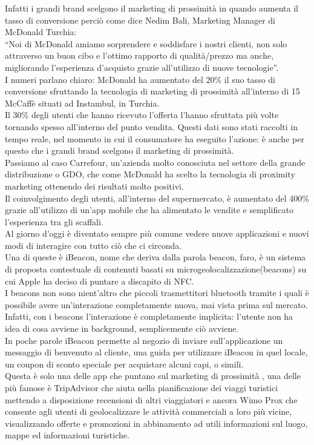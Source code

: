 Infatti i grandi brand scelgono il marketing di prossimità in quando aumenta il tasso di conversione perciò come dice Nedim Bali, Marketing Manager di McDonald Turchia:\\
“Noi di McDonald amiamo sorprendere e soddisfare i nostri clienti, non solo attraverso un buon cibo e l’ottimo rapporto di qualità/prezzo ma anche, migliorando l’esperienza d’acquisto grazie all’utilizzo di nuove tecnologie”.\cite{rif9}\\
I numeri parlano chiaro:
McDonald ha aumentato del 20\% il suo tasso di conversione sfruttando la tecnologia di marketing di prossimità all’interno di 15 McCaffè situati ad Instambul, in Turchia.\\ Il 30\% degli utenti che hanno ricevuto l’offerta l’hanno sfruttata più volte tornando spesso all’interno del punto vendita. Questi dati sono stati raccolti in tempo reale, nel momento in cui il consumatore ha eseguito l’azione: è anche per questo che i grandi brand scelgono il marketing di prossimità.\\
Passiamo al caso Carrefour, un’azienda molto conosciuta nel settore della grande distribuzione o GDO, che come McDonald ha scelto la tecnologia di proximity marketing ottenendo dei risultati molto positivi.\\
Il coinvolgimento degli utenti, all’interno del supermercato, è aumentato del 400\% grazie all’utilizzo di un’app mobile che ha alimentato le vendite e semplificato l’esperienza tra gli scaffali.\\[0.2cm]

Al giorno d'oggi è diventato sempre più comune vedere nuove applicazioni e nuovi modi di interagire con tutto ciò che ci circonda.\\
Una di queste è iBeacon, nome che deriva dalla parola beacon, faro, è un sistema di proposta contestuale di contenuti basati su microgeolocalizzazione(beacons) su cui Apple ha deciso di puntare a discapito di NFC.\\
I beacons non sono nient’altro che piccoli trasmettitori bluetooth tramite i quali è possibile avere un’interazione completamente nuova, mai vista prima sul mercato. Infatti, con i beacons l’interazione è completamente implicita: l’utente non ha idea di cosa avviene in background, semplicemente ciò avviene.\\
In poche parole iBeacon permette al negozio di inviare sull’applicazione un messaggio di benvenuto al cliente, una guida per utilizzare iBeacon in quel locale, un coupon di sconto speciale per acquistare alcuni capi, o simili.\\
Questa è solo una delle app che puntano sul marketing di prossimità , una delle più famose è TripAdvisor che aiuta nella pianificazione dei viaggi turistici mettendo a disposizione recensioni di altri viaggiatori e ancora Wimo Prox che consente agli utenti di geolocalizzare le attività commerciali a loro più vicine, visualizzando offerte e promozioni in abbinamento ad utili informazioni sul luogo, mappe ed informazioni turistiche.\\

